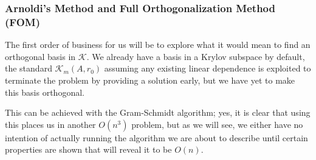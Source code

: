 \documentclass[11pt]{article}
\begin{document}
\subsubsection{Arnoldi's Method and Full Orthogonalization Method (FOM)}

The first order of business for us will be to explore what it would mean to find an orthogonal basis in $\mathcal{K}$. We already have a basis in a Krylov subspace by default, the standard $\mathcal{K}_m (A,r_0)$ assuming any existing linear dependence is exploited to terminate the problem by providing a solution early, but we have yet to make this basis orthogonal.

This can be achieved with the Gram-Schmidt algorithm; yes, it is clear that using this places us in another $O(n^3)$ problem, but as we will see, we either have no intention of actually running the algorithm we are about to describe until certain properties are shown that will reveal it to be $O(n)$.
\end{document}
